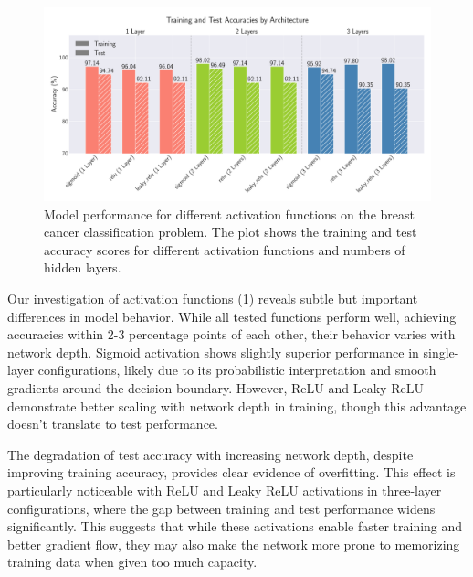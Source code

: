 \onecolumngrid
\begin{figure}[h!]
    \begin{minipage}{\textwidth}
        \centering
        \includegraphics[width = .9\textwidth]{../figs/classification_activations_layers.pdf}
        \caption{Model performance for different activation functions on the breast cancer classification problem. The plot shows the training and test accuracy scores for different activation functions and numbers of hidden layers.}
        \label{fig:NN_Classification_activations_layers}
    \end{minipage}
\end{figure}
\twocolumngrid

Our investigation of activation functions (\cref{fig:NN_Classification_activations_layers}) reveals subtle but important differences in model behavior. While all tested functions perform well, achieving accuracies within 2-3 percentage points of each other, their behavior varies with network depth. Sigmoid activation shows slightly superior performance in single-layer configurations, likely due to its probabilistic interpretation and smooth gradients around the decision boundary. However, ReLU and Leaky ReLU demonstrate better scaling with network depth in training, though this advantage doesn't translate to test performance.

The degradation of test accuracy with increasing network depth, despite improving training accuracy, provides clear evidence of overfitting. This effect is particularly noticeable with ReLU and Leaky ReLU activations in three-layer configurations, where the gap between training and test performance widens significantly. This suggests that while these activations enable faster training and better gradient flow, they may also make the network more prone to memorizing training data when given too much capacity.

